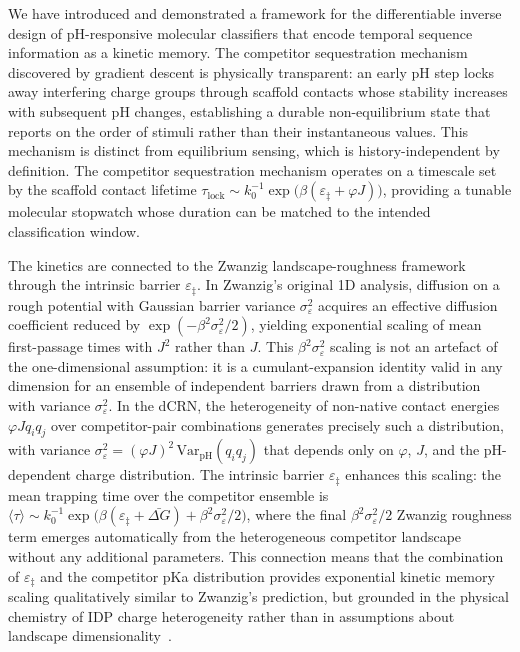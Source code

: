 \documentclass[10pt,twocolumn]{article}
\begin{document}
We have introduced and demonstrated a framework for the differentiable inverse design of pH-responsive molecular classifiers that encode temporal sequence information as a kinetic memory.
The competitor sequestration mechanism discovered by gradient descent is physically transparent: an early pH step locks away interfering charge groups through scaffold contacts whose stability increases with subsequent pH changes, establishing a durable non-equilibrium state that reports on the order of stimuli rather than their instantaneous values.
This mechanism is distinct from equilibrium sensing, which is history-independent by definition.
The competitor sequestration mechanism operates on a timescale set by the scaffold contact lifetime $\tau_\mathrm{lock} \sim k_0^{-1}\exp\!\bigl(\beta(\varepsilon_\ddagger + \varphi J)\bigr)$, providing a tunable molecular stopwatch whose duration can be matched to the intended classification window.

The kinetics are connected to the Zwanzig landscape-roughness framework~\cite{zwanzig1988} through the intrinsic barrier $\varepsilon_\ddagger$.
In Zwanzig's original 1D analysis, diffusion on a rough potential with Gaussian barrier variance $\sigma_\varepsilon^2$ acquires an effective diffusion coefficient reduced by $\exp(-\beta^2\sigma_\varepsilon^2/2)$, yielding exponential scaling of mean first-passage times with $J^2$ rather than $J$.
This $\beta^2\sigma_\varepsilon^2$ scaling is not an artefact of the one-dimensional assumption: it is a cumulant-expansion identity valid in any dimension for an ensemble of independent barriers drawn from a distribution with variance $\sigma_\varepsilon^2$.
In the dCRN, the heterogeneity of non-native contact energies $\varphi J q_i q_j$ over competitor-pair combinations generates precisely such a distribution, with variance $\sigma_\varepsilon^2 = (\varphi J)^2 \,\mathrm{Var}_\mathrm{pH}(q_i q_j)$ that depends only on $\varphi$, $J$, and the pH-dependent charge distribution.
The intrinsic barrier $\varepsilon_\ddagger$ enhances this scaling: the mean trapping time over the competitor ensemble is $\langle\tau\rangle \sim k_0^{-1}\exp\!\bigl(\beta(\varepsilon_\ddagger + \bar{\Delta G}) + \beta^2\sigma_\varepsilon^2/2\bigr)$, where the final $\beta^2\sigma_\varepsilon^2/2$ Zwanzig roughness term emerges automatically from the heterogeneous competitor landscape without any additional parameters.
This connection means that the combination of $\varepsilon_\ddagger$ and the competitor pKa distribution provides exponential kinetic memory scaling qualitatively similar to Zwanzig's prediction, but grounded in the physical chemistry of IDP charge heterogeneity rather than in assumptions about landscape dimensionality~\cite{hyeon2003,bryngelson1987}.
\end{document}
